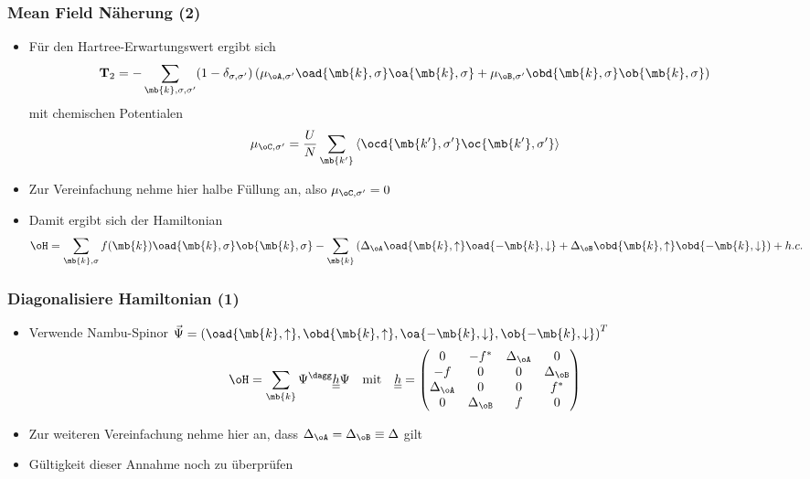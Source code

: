 \begin{frame}
	\frametitle{ Mean Field Näherung (2) }
    \begin{itemize}
        \item Für den Hartree-Erwartungswert ergibt sich 
        \begin{align*}
            \mathbf{T}_2 &= - \sum_{\mb{k}, \sigma, \sigma'} (1 - \delta_{\sigma, \sigma'}) \left( \mu_{\oA, \sigma'} \oad{\mb{k}, \sigma} \oa{\mb{k}, \sigma} + \mu_{\oB, \sigma'} \obd{\mb{k},\sigma} \ob{\mb{k}, \sigma} \right)
        \end{align*}
        mit chemischen Potentialen 
        \begin{align*}
            \mu_{\oC, \sigma'} &= \frac{U}{N} \sum_{\mb{k'}} \expval{ \ocd{\mb{k'}, \sigma'} \oc{\mb{k'}, \sigma'} }
        \end{align*}
        \item Zur Vereinfachung nehme hier halbe Füllung an, also $\mu_{\oC, \sigma'} = 0$
        \item Damit ergibt sich der Hamiltonian 
        \begin{align*}
            \oH &= \sum_{\mb{k}, \sigma} f(\mb{k}) \oad{\mb{k}, \sigma} \ob{\mb{k},\sigma} - \sum_{\mb{k}} \left(\Delta_{\oA} \oad{\mb{k},\uparrow} \oad{-\mb{k}, \downarrow} + \Delta_{\oB} \obd{\mb{k}, \uparrow} \obd{-\mb{k}, \downarrow}  \right) + h.c.
        \end{align*}
    \end{itemize}
\end{frame}

\begin{frame}
	\frametitle{ Diagonalisiere Hamiltonian (1)}
    \begin{itemize}
        \item Verwende Nambu-Spinor $\vec{\Psi} = \left(\oad{\mb{k}, \uparrow} , \obd{\mb{k}, \uparrow} , \oa{-\mb{k}, \downarrow} , \ob{-\mb{k}, \downarrow}\right)^T$ 
        \begin{align*}
            \oH &= \sum_{\mb{k}} \Psi^\dagg \underline{\underline  {h}} \Psi  & &\text{mit} & \underline{\underline  {h}} &= \begin{pmatrix}
                0 & -f^* & \Delta_{\oA} & 0 \\
                -f & 0 & 0 & \Delta_{\oB} \\
                \Delta_{\oA} & 0 & 0 & f^* \\
                0 & \Delta_{\oB} & f & 0
            \end{pmatrix}
        \end{align*}
        \item  Zur weiteren Vereinfachung nehme hier an, dass $\Delta_{\oA} = \Delta_{\oB} \equiv \Delta$ gilt
        \item Gültigkeit dieser Annahme noch zu überprüfen
    \end{itemize}
\end{frame}


